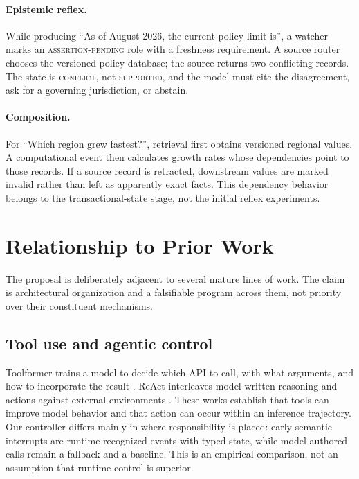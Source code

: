 \documentclass[11pt]{article}
\begin{document}
\paragraph{Epistemic reflex.}
While producing ``As of August 2026, the current policy limit is'', a watcher
marks an \textsc{assertion-pending} role with a freshness requirement.  A source
router chooses the versioned policy database; the source returns two conflicting
records.  The state is \textsc{conflict}, not \textsc{supported}, and the model
must cite the disagreement, ask for a governing jurisdiction, or abstain.

\paragraph{Composition.}
For ``Which region grew fastest?'', retrieval first obtains versioned regional
values.  A computational event then calculates growth rates whose dependencies
point to those records.  If a source record is retracted, downstream values are
marked invalid rather than left as apparently exact facts.  This dependency
behavior belongs to the transactional-state stage, not the initial reflex
experiments.

\section{Relationship to Prior Work}

The proposal is deliberately adjacent to several mature lines of work.  The
claim is architectural organization and a falsifiable program across them, not
priority over their constituent mechanisms.

\subsection{Tool use and agentic control}

Toolformer trains a model to decide which API to call, with what arguments, and
how to incorporate the result \cite{toolformer}.  ReAct interleaves model-written
reasoning and actions against external environments \cite{react}.  These works
establish that tools can improve model behavior and that action can occur within
an inference trajectory.  Our controller differs mainly in where responsibility
is placed: early semantic interrupts are runtime-recognized events with typed
state, while model-authored calls remain a fallback and a baseline.  This is an
empirical comparison, not an assumption that runtime control is superior.
\end{document}
